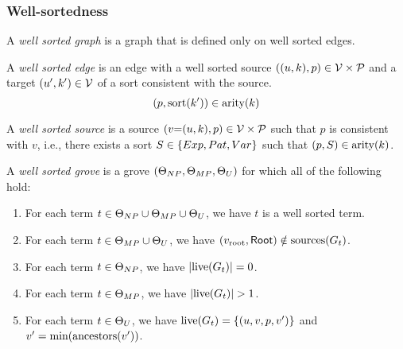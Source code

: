 
\subsubsection{Well-sortedness}

\begin{definition}
  A \emph{well sorted graph} is a graph that is defined only on well sorted edges.
\end{definition}

\begin{definition}
  A \emph{well sorted edge} is an edge with a well sorted source $((u, k), p) \in \V \times \P$
  and a target $(u', k') \in \V$ of a sort consistent with the source.
  \[
    \left( p, \sort{k'} \right) \in \arity{k}
  \]
\end{definition}

\begin{definition}
  A \emph{well sorted source} is a source $(v{=}(u, k), p) \in \V \times \P$ such that $p$ is consistent with $v$,
  i.e., there exists a sort $S \in \SetOf{Exp, Pat, Var}$ such that $(p, S) \in \arity{k}$.
\end{definition}

\begin{definition}
  A \emph{well sorted grove} is a grove $(\Set[NP], \Set[MP], \Set[U])$ for which all of the following hold:
  \begin{enumerate}
    \item For each term $t \in \Set[NP] \cup \Set[MP] \cup \Set[U]$, we have $t$ is a well sorted term.
    \item For each term $t \in \Set[MP] \cup \Set[U]$, we have $(\rootVertex, \Root) \notin \sources{G_t}$.
    \item For each term $t \in \Set[NP]$, we have $\SizeOf{\live{G_t}} = 0$.
    \item For each term $t \in \Set[MP]$, we have $\SizeOf{\live{G_t}} > 1$.
    \item For each term $t \in \Set[U]$, we have $\live{G_t} = \SetOf{(u, v, p, v')}$ and $v' = \min{\ancestors{v'}}$.
  \end{enumerate}
\end{definition}

